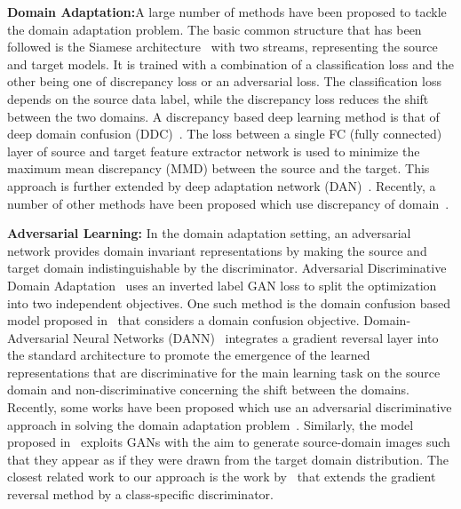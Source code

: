 \documentclass{bmvc2k}
\begin{document}
\qquad \textbf{{Domain Adaptation:}}A large number of methods have been proposed to tackle the domain adaptation problem. The basic common structure that has been followed is the Siamese architecture~\cite{bromley_NIPS1994} with two streams, representing the source and target models. It is trained with a combination of a classification loss and the other being one of discrepancy loss or an adversarial loss. The classification loss depends on the source data label,  while the discrepancy loss reduces the shift between the two domains. A discrepancy based deep learning method is that of deep domain confusion (DDC)~\cite{tzeng_arxiv2014}. The loss between a single FC (fully connected) layer of source and target feature extractor network is used to minimize the maximum mean discrepancy (MMD) between the source and the target. This approach is further extended by deep adaptation network (DAN)~\cite{long_ICML2015}. Recently, a number of other methods have been proposed which use discrepancy of domain~\cite{saito_cvpr2017maximum,zhang_cvpr2018aligning,sun_ECCV2016,sun_DACVA2017,sun_2016AAAI,shen_AAAI2018wasserstein,long_ICML2017,rozantsev_PAMI2018}.


\textbf{{Adversarial Learning:}}
In the domain adaptation setting, an adversarial network provides domain invariant representations by making the source and target domain indistinguishable by the discriminator. Adversarial Discriminative Domain Adaptation~\cite{tzeng_CVPR2017} uses an inverted label GAN loss to split the optimization into two independent objectives. One such method is the domain confusion based model proposed in~\cite{tzeng_ICCV2015} that considers a domain confusion objective. Domain-Adversarial Neural Networks (DANN)~\cite{ganin_ICML2015} integrates a gradient reversal layer into the standard architecture to promote the emergence of the learned representations that are discriminative for the main learning task on the source domain and non-discriminative concerning the shift between the domains. Recently, some works have been proposed which use an adversarial discriminative approach in solving the domain adaptation problem~\cite{saito2018adversarial,hoffman_2018cycada,bousmalis_2017CVPR,zhang_cvpr2018importance,chen_cvpr2018re,li_cvpr2018domain,kurmi2019attending}. 
Similarly, the model proposed in~\cite{bousmalis_CVPR2017,choi2017_cvprstargan} exploits GANs with the aim to generate source-domain images such that they appear as if they were drawn from the target domain distribution. The closest related work to our approach is the work by~\cite{pei_arxiv2018} that extends the gradient reversal method  by a class-specific discriminator. 
\end{document}
